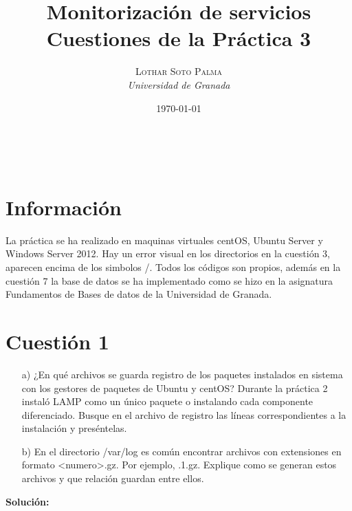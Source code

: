 \documentclass[a4paper, 10pt]{article} %
\title{\textbf{Monitorización de servicios}\\ %
\vspace{20 pt}
Cuestiones de la Práctica 3} %
\author{\textsc{Lothar Soto Palma} %
\\{\textit{Universidad de Granada}}} %
\date{\today} %
\makeatletter
\renewcommand{\maketitle}{ %
\begin{center} %
{\Huge\@title} %
\end{center}

\vspace{20pt} %

\begin{flushright} %
{\large\@author} %
\\\@date %

\vspace{40pt} %
\end{flushright}
\renewcommand{\baselinestretch}{0.5}

}
\makeatother
\begin{document}
\thispagestyle{empty}
\maketitle
\pagebreak
\thispagestyle{empty}
\tableofcontents
\pagebreak
\listoffigures
\setcounter{page}{1}
\section{Información}
La práctica se ha realizado en maquinas virtuales centOS, Ubuntu Server y Windows Server 2012. Hay un error visual en los directorios en la cuestión 3, aparecen encima de los simbolos /. Todos los códigos son propios, además en la cuestión 7 la base de datos se ha implementado como se hizo en la asignatura Fundamentos de Bases de datos de la Universidad de Granada.
\section{Cuestión 1}
\begin{itemize}
\item[a)] ¿En qué archivos se guarda registro de los paquetes instalados en sistema con los gestores de paquetes de Ubuntu y centOS? Durante la práctica 2 instaló LAMP como un único paquete o instalando cada componente diferenciado. Busque en el archivo de registro las líneas correspondientes a la instalación y preséntelas.
\item[b)] En el directorio /var/log es común encontrar archivos con extensiones en formato <numero>.gz. Por ejemplo, .1.gz. Explique como se generan estos archivos y que relación guardan entre ellos.
\end{itemize}
\textbf{Solución:}\\
\end{document}
